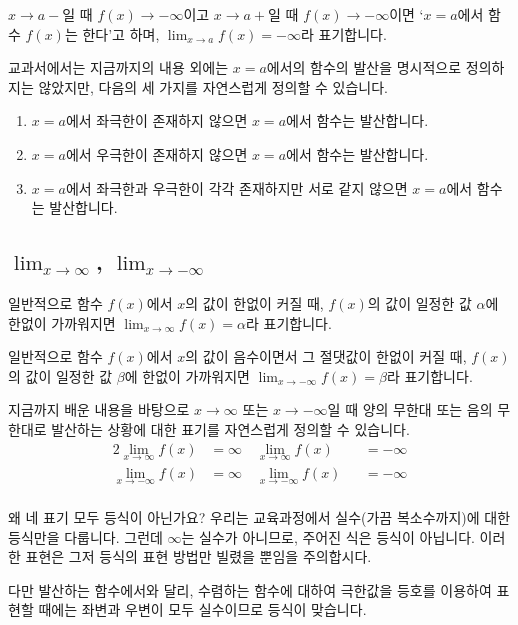 $x \to a-$일 때 $f\left( x \right) \to -\infty$이고 $x \to a+$일 때 $f\left( x \right) \to -\infty$이면 `$x=a$에서 함수 $f\left( x \right) $는 한다'고 하며, $\lim_{x \to a} f\left( x \right) = -\infty$라 표기합니다. 

교과서에서는 지금까지의 내용 외에는 $x=a$에서의 함수의 발산을 명시적으로 정의하지는 않았지만, 다음의 세 가지를 자연스럽게 정의할 수 있습니다.
\begin{enumerate}[label=\onum*]
    \item $x=a$에서 좌극한이 존재하지 않으면 $x=a$에서 함수는 발산합니다.
    \item $x=a$에서 우극한이 존재하지 않으면 $x=a$에서 함수는 발산합니다.
    \item $x=a$에서 좌극한과 우극한이 각각 존재하지만 서로 같지 않으면 $x=a$에서 함수는 발산합니다. 
\end{enumerate}



\subsection{$\lim_{x \to \infty}$, $\lim_{x \to -\infty}$}
일반적으로 함수 $f\left( x \right) $에서 $x$의 값이 한없이 커질 때, $f\left( x \right) $의 값이 일정한 값 $\alpha$에 한없이 가까워지면 $\lim_{x \to \infty}f\left( x \right) =\alpha$라 표기합니다.

일반적으로 함수 $f\left( x \right) $에서 $x$의 값이 음수이면서 그 절댓값이 한없이 커질 때, $f\left( x \right) $의 값이 일정한 값 $\beta$에 한없이 가까워지면 $\lim_{x \to -\infty}f\left( x \right) =\beta$라 표기합니다.

지금까지 배운 내용을 바탕으로 $x \to \infty$ 또는 $x \to -\infty$일 때 양의 무한대 또는 음의 무한대로 발산하는 상황에 대한 표기를 자연스럽게 정의할 수 있습니다.
\begin{alignat*}{2}
\lim_{x \to \infty}f\left( x \right) &= \infty\quad \lim_{x \to \infty}f\left( x \right) &&= -\infty\\
\lim_{x \to -\infty}f\left( x \right) &= \infty\quad \lim_{x \to -\infty}f\left( x \right) &&= -\infty\\
\end{alignat*}
\begin{remark}{왜 네 표기 모두 등식이 아닌가요?}%
    우리는 교육과정에서 실수(가끔 복소수까지)에 대한 등식만을 다룹니다. 그런데 $\infty$는 실수가 아니므로, 주어진 식은 등식이 아닙니다. 이러한 표현은 그저 등식의 표현 방법만 빌렸을 뿐임을 주의합시다.
    
    다만 발산하는 함수에서와 달리, 수렴하는 함수에 대하여 극한값을 등호를 이용하여 표현할 때에는 좌변과 우변이 모두 실수이므로 등식이 맞습니다.
\end{remark} 
